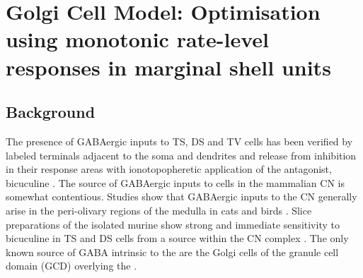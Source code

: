 
\graphicspath{{../figures/}{./gfx/}{/media/data/Work/cnstellate/golgi/}{../../cnstellate/}}

\section[Golgi Cell Model]{Golgi Cell Model: Optimisation using monotonic
  rate-level responses in marginal shell units}
\label{sec:GolgiCellModel}

\subsection{Background}

The presence of GABAergic inputs to TS, DS and TV cells has been verified by
labeled terminals adjacent to the soma and dendrites
\citep{SmithRhode:1989,AwatramaniTurecekEtAl:2005,BabalianRyugoEtAl:2003} and
release from inhibition in their response areas with ionotopopheretic
application of the \GABAa antagonist, bicuculine
\citep{EvansZhao:1998,CasparyBackoffEtAl:1994,BackoffShadduckEtAl:1999,FerragamoGoldingEtAl:1998a}. The
source of GABAergic inputs to cells in the mammalian CN is somewhat
contentious. Studies show that GABAergic inputs to the CN generally arise in the
peri-olivary regions of the medulla in cats \citep{OstapoffBensonEtAl:1997} and
birds \citep{LachicaRubsamenEtAl:1995,YangMonsivaisEtAl:1999}. Slice
preparations of the isolated murine \VCN show strong and immediate sensitivity to
bicuculine in TS and DS cells from a source within the CN complex
\citep{FerragamoGoldingEtAl:1998a}.  The only known source of GABA intrinsic to
the \VCN are the Golgi cells of the granule cell domain (GCD) overlying the \VCN
\citep[Fig.~\ref{fig:CNdiagram}]{Mugnaini:1985,FerragamoGoldingEtAl:1998}.



